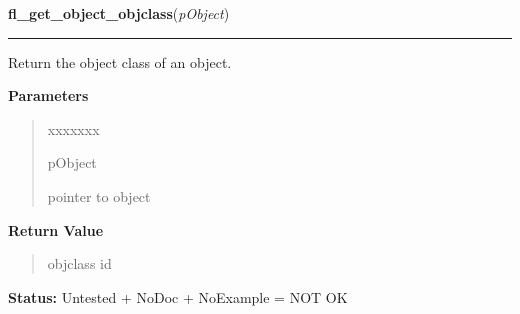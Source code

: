 \hspace{.8\funcindent}\begin{boxedminipage}{\funcwidth}

    \raggedright \textbf{fl\_get\_object\_objclass}(\textit{pObject})

    \vspace{-1.5ex}

    \rule{\textwidth}{0.5\fboxrule}
\setlength{\parskip}{2ex}
    Return the object class of an object.

\setlength{\parskip}{1ex}
      \textbf{Parameters}
      \vspace{-1ex}

      \begin{quote}
        \begin{Ventry}{xxxxxxx}

          \item[pObject]

          pointer to object

        \end{Ventry}

      \end{quote}

      \textbf{Return Value}
    \vspace{-1ex}

      \begin{quote}
      objclass id

      \end{quote}

\textbf{Status:} Untested + NoDoc + NoExample = NOT OK



    \end{boxedminipage}

    \label{xformslib:library:fl_get_object_type}

    \vspace{0.5ex}

